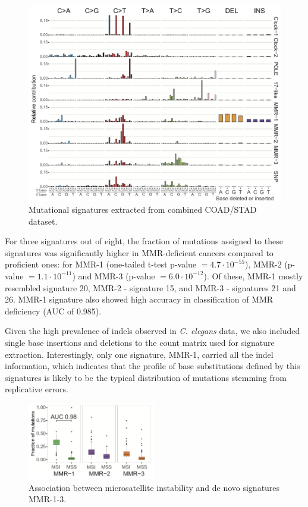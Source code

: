 \begin{figure}[h]
  \centering
    \centerline{\includegraphics[width=1\textwidth]{figures/COADsigs.png}}
  \caption{Mutational signatures extracted from combined COAD/STAD dataset.}
  \label{COADsigs}
\end{figure}

For three signatures out of eight, the fraction of mutations assigned to these signatures was 
significantly higher in MMR-deficient cancers compared to proficient ones: for MMR-1 (one-tailed 
t-test p-value $= 4.7 \cdot 10^{-55}$), MMR-2 (p-value $= 1.1 \cdot 10^{-11}$) and MMR-3 
(p-value $= 6.0 \cdot 10^{-12}$). Of these, MMR-1 mostly resembled signature 20, MMR-2 - 
signature 15, and MMR-3 - signatures 21 and 26. MMR-1 signature also showed high accuracy 
in classification of MMR deficiency (AUC of 0.985).

Given the high prevalence of indels observed in \textit{C. elegans} data, we also included single
base insertions and deletions to the count matrix used for signature extraction. Interestingly, 
only one signature, MMR-1, carried all the indel information, which indicates that the profile 
of base substitutions defined by this signatures is likely to be the typical distribution of
mutations stemming from replicative errors.

\begin{figure}
  \centering
\centerline{\includegraphics[width=0.5\textwidth]{figures/MSIcorr.png}}
  \caption{Association between microsatellite instability and de novo signatures MMR-1-3.}
  \label{MSIcorr}
\end{figure}

